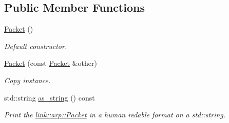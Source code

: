 \subsection*{Public Member Functions}
\begin{DoxyCompactItemize}
\item 
\hyperlink{structlink_1_1arp_1_1Packet_a31f07149ad68e4b17255a4288cd250ab}{Packet} ()
\begin{DoxyCompactList}\small\item\em Default constructor. \end{DoxyCompactList}\item 
\hyperlink{structlink_1_1arp_1_1Packet_a96f29d607c34ae169c28e5d01b111905}{Packet} (const \hyperlink{structlink_1_1arp_1_1Packet}{Packet} \&other)
\begin{DoxyCompactList}\small\item\em Copy instance. \end{DoxyCompactList}\item 
std\+::string \hyperlink{structlink_1_1arp_1_1Packet_a52f7b2c60b11900664c7be8965d7846b}{as\+\_\+string} () const 
\begin{DoxyCompactList}\small\item\em Print the \hyperlink{structlink_1_1arp_1_1Packet}{link\+::arp\+::\+Packet} in a human redable format on a std\+::string. \end{DoxyCompactList}\end{DoxyCompactItemize}
